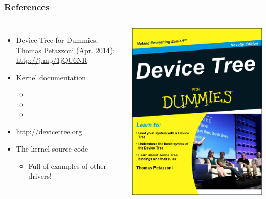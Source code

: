 \begin{frame}
  \frametitle{References}
  \begin{columns}
       \begin{itemize}
       \item Device Tree for Dummies, Thomas Petazzoni (Apr. 2014):
             \url{http://j.mp/1jQU6NR}
       \item Kernel documentation
         \begin{itemize}
         \item {}
         \item {}
         \item {}
         \end{itemize}
      \item \url{http://devicetree.org}
       \item The kernel source code
         \begin{itemize}
         \item Full of examples of other drivers!
         \end{itemize}
       \end{itemize}
    \includegraphics[height=0.8\textheight]{slides/kernel-device-model/device-tree-for-dummies.png}
  \end{columns}
\end{frame}

